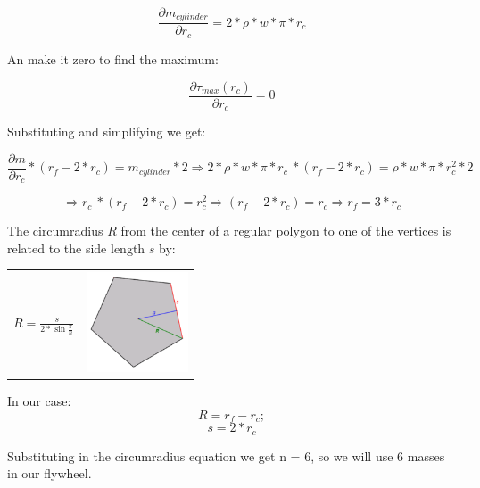 \[ \frac{\partial  m_{cylinder}}{\partial r_c} = 2 * \rho * w * \pi *  r_c\]

An make it zero to find the maximum:

\[\frac{\partial \tau _{max} (r_c)}{\partial r_c} = 0\]

Substituting and simplifying we get:

\[\frac{\partial m}{\partial r_c} * (r_f - 2 * r_c) =   m_{cylinder} * 2 \Rightarrow 2 * \rho * w * \pi *  r_c\ * (r_f - 2 * r_c) = \rho * w * \pi * r_c^2 * 2 \]

\[ \Rightarrow r_c\ * (r_f - 2 * r_c) =  r_c^2 \Rightarrow (r_f - 2 * r_c) =  r_c \Rightarrow \boxed{r_f = 3 * r_c}\]


The circumradius $R$ from the center of a regular polygon to one of the vertices is related to the side length $s$ by:

\begin{center}
	\begin{tabular}{ c  c }
		\(\displaystyle R=\frac {s}{2* \sin{\frac {\pi} {n}}} \)
		& 
		\includegraphics[width=3cm]{img/PolygonParameters.png}
	\end{tabular}
\end{center}

In our case:
\[ R = r_f - r_c; \]
\[ s = 2 * r_c\]

Substituting in the circumradius equation we get n = 6, so we will use 6 masses in our flywheel.